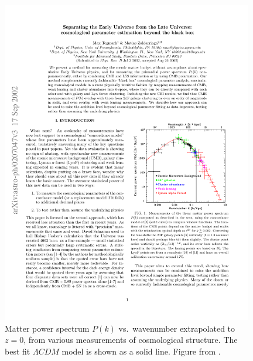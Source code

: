 \begin{figure}
\centering
\includegraphics[width=110mm]{./plots/pk.pdf}
\caption{Matter power spectrum $P(k)$ vs.~wavenumber extrapolated to $z=0$, from various measurements of cosmological structure. The best fit $\Lambda CDM$ model is shown as a solid line. Figure from \citet{Tegmark2002b}.}
\label{fig:pk}
\end{figure}

